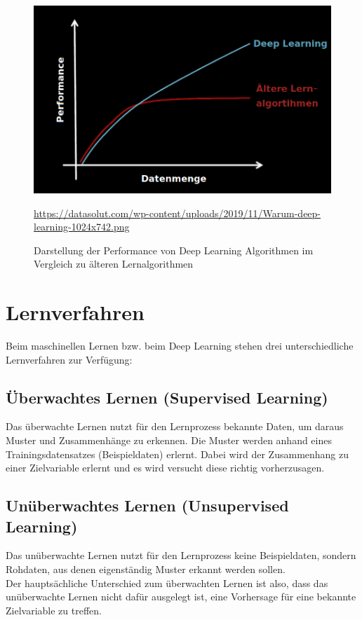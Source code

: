 \begin{figure}[H]
	\centering
	\includegraphics[scale=0.4]{kapitel3/images/Deep_Learning_Performance.png}
	\label{fig:deep-learning-performance}
	\caption{Darstellung der Performance von Deep Learning Algorithmen im Vergleich zu älteren Lernalgorithmen}
	\vspace{0.2cm}
	\quelle\url{https://datasolut.com/wp-content/uploads/2019/11/Warum-deep-learning-1024x742.png}
\end{figure}

\section{Lernverfahren}

Beim maschinellen Lernen bzw. beim Deep Learning stehen drei unterschiedliche Lernverfahren zur Verfügung:

\subsection{Überwachtes Lernen (Supervised Learning)}

	Das überwachte Lernen nutzt für den Lernprozess bekannte Daten, um daraus Muster und Zusammenhänge zu erkennen. Die Muster werden  anhand eines Trainingsdatensatzes (Beispieldaten) erlernt. Dabei wird der Zusammenhang zu einer Zielvariable erlernt und es wird versucht diese richtig vorherzusagen. \cite{datasolut3}

\subsection{Unüberwachtes Lernen (Unsupervised Learning)}

	Das unüberwachte Lernen nutzt für den Lernprozess keine Beispieldaten, sondern Rohdaten, aus denen eigenständig Muster erkannt werden sollen. \\
	Der hauptsächliche Unterschied zum überwachten Lernen ist also, dass das unüberwachte Lernen nicht dafür ausgelegt ist, eine Vorhersage für eine bekannte Zielvariable zu treffen. \cite{datasolut3}
	

